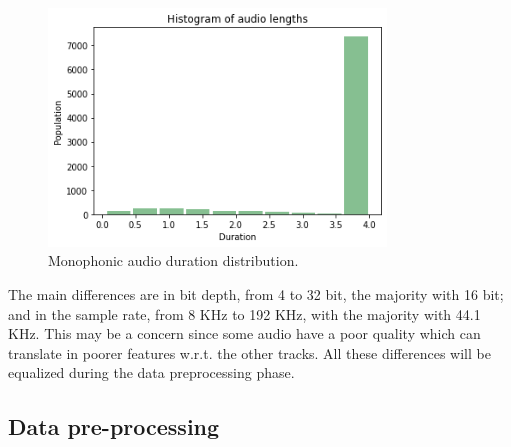 \documentclass{article}
\begin{document}
\begin{figure}[H]
	\centering
	\includegraphics[width=0.8\textwidth]{./images/mono/duration.png}	
	\caption{Monophonic audio duration distribution.}
	\label{fig:mono_duration}
\end{figure}

The main differences are in bit depth, from 4 to 32 bit, the majority with 16 bit; and in the sample rate, from 8 KHz to 192 KHz, with the majority with 44.1 KHz. This may be a concern since some audio have a poor quality which can translate in poorer features w.r.t. the other tracks. All these differences will be equalized during the data preprocessing phase.

\subsection{Data pre-processing}
\label{subsec:mono_feature}
\end{document}
